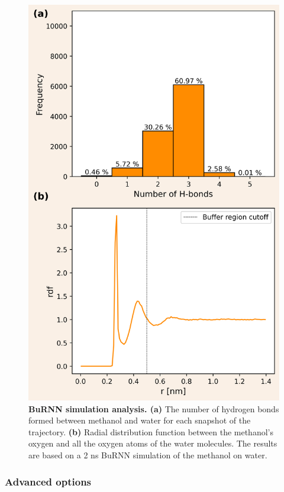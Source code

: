 \begin{figure}[H]
\centering
\includegraphics[scale=.66]{../09_tutorial_06/figures/burnn_livecoms_v2.png}
\caption{\textbf{BuRNN simulation analysis. (a)} The number of hydrogen bonds formed between methanol and water for each snapshot of the trajectory. \textbf{(b)} Radial distribution function between the methanol's oxygen and all the oxygen atoms of the water molecules. The results are based on a 2 ns BuRNN simulation of the methanol on water.}
\label{BuRNN_ana}
\end{figure}



\subsubsection{Advanced options}
